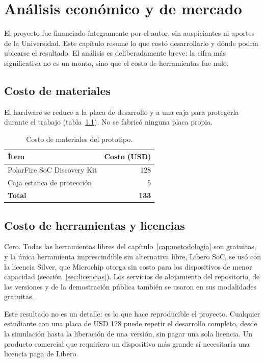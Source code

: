 \chapter{Análisis económico y de mercado}
\label{cap:economico}

El proyecto fue financiado íntegramente por el autor, sin auspiciantes ni
aportes de la Universidad. Este capítulo resume lo que costó desarrollarlo y
dónde podría ubicarse el resultado. El análisis es deliberadamente breve: la
cifra más significativa no es un monto, sino que el costo de herramientas fue
nulo.

\section{Costo de materiales}

El hardware se reduce a la placa de desarrollo y a una caja para protegerla
durante el trabajo (tabla~\ref{tab:costo-materiales}). No se fabricó ninguna
placa propia.

\begin{table}[ht]
  \centering
  \begin{tabular}{lr}
    \toprule
    \textbf{Ítem} & \textbf{Costo (USD)} \\
    \midrule
    PolarFire SoC Discovery Kit & 128 \\
    Caja estanca de protección & 5 \\
    \midrule
    \textbf{Total} & \textbf{133} \\
    \bottomrule
  \end{tabular}
  \caption{Costo de materiales del prototipo.}
  \label{tab:costo-materiales}
\end{table}

\section{Costo de herramientas y licencias}

Cero. Todas las herramientas libres del capítulo~\ref{cap:metodologia} son
gratuitas, y la única herramienta imprescindible sin alternativa libre,
Libero SoC, se usó con la licencia Silver, que Microchip otorga sin costo
para los dispositivos de menor capacidad (sección~\ref{sec:licencias}). Los
servicios de alojamiento del repositorio, de las versiones y de la
demostración pública también se usaron en sus modalidades gratuitas.

Este resultado no es un detalle: es lo que hace reproducible el proyecto.
Cualquier estudiante con una placa de USD 128 puede repetir el desarrollo
completo, desde la simulación hasta la liberación de una versión, sin pagar
una sola licencia. Un producto comercial que requiriera un dispositivo más
grande sí necesitaría una licencia paga de Libero.


